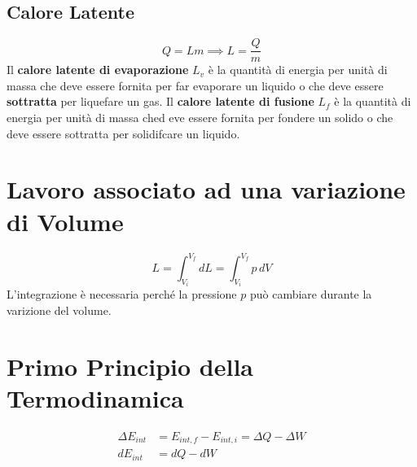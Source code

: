         \subsection*{Calore Latente}
            \begin{equation*}
                Q = Lm \implies L = \frac{Q}{m}
            \end{equation*}
        Il \textbf{calore latente di evaporazione} $L_v$ è la quantità di 
        energia per unità di massa che deve essere fornita per far evaporare un
        liquido o che deve essere \textbf{sottratta} per liquefare un gas. Il 
        \textbf{calore latente di fusione} $L_f$ è la quantità di energia per 
        unità di massa ched eve essere fornita per fondere un solido o che deve
        essere sottratta per solidifcare un liquido.
        
    \section*{Lavoro associato ad una variazione di Volume} 
        \begin{equation*}
            L = \int_{V_i}^{V_f} dL =  \int_{V_i}^{V_f} p \,dV  
        \end{equation*}
    L'integrazione è necessaria perché la pressione $p$ può cambiare durante la
    varizione del volume.

    \section*{Primo Principio della Termodinamica}
        \begin{align*}
            \Delta E_{int} &= E_{int, f} - E_{int, i} = \Delta Q - \Delta W \\
            d E_{int} &= d Q - d W
        \end{align*}

